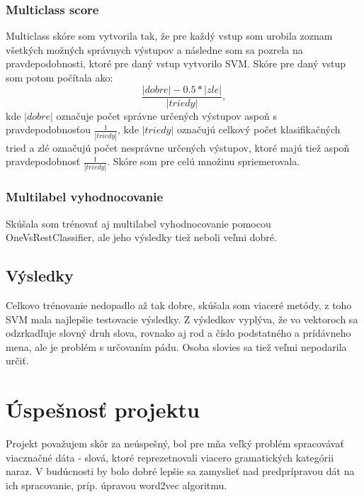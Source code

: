 \documentclass[12pt]{article}
\begin{document}
\subsubsection{Multiclass score}
Multiclass skóre som vytvorila tak, že pre každý vstup som urobila zoznam všetkých možných správnych výstupov a následne som sa pozrela na pravdepodobnosti, ktoré pre daný vstup vytvorilo SVM. Skóre pre daný vstup som potom počítala ako:
\[\frac{|dobre|-0.5*|zle|}{|triedy|},\]
kde $|dobre|$ označuje počet správne určených výstupov aspoň s pravdepodobnosťou $\frac{1}{|triedy|}$, kde $|triedy|$ označujú celkový počet klasifikačných tried a zlé označujú počet nesprávne určených výstupov, ktoré majú tiež aspoň pravdepodobnosť $\frac{1}{|triedy|}$. Skóre som pre celú množinu spriemerovala. 


\subsubsection{Multilabel vyhodnocovanie}
Skúšala som trénovať aj multilabel vyhodnocovanie pomocou OneVsRestClassifier, ale jeho výsledky tiež neboli veľmi dobré. 

\subsection{Výsledky}
Celkovo trénovanie nedopadlo až tak dobre, skúšala som viaceré metódy, z toho SVM mala najlepšie testovacie výsledky. Z výsledkov vyplýva, že vo vektoroch sa odzrkadľuje slovný druh slova, rovnako aj rod a číslo podstatného a prídávneho mena, ale je problém s určovaním pádu. Osoba slovies sa tiež veľmi nepodarila určiť. 

\section{Úspešnosť projektu}
Projekt považujem skôr za neúspešný, bol pre mňa veľký problém spracovávať viacznačné dáta - slová, ktoré reprezetnovali viacero gramatických kategórii naraz. V budúcnosti by bolo dobré lepšie sa zamyslieť nad predprípravou dát na ich spracovanie, príp. úpravou word2vec algoritmu. 
\end{document}

